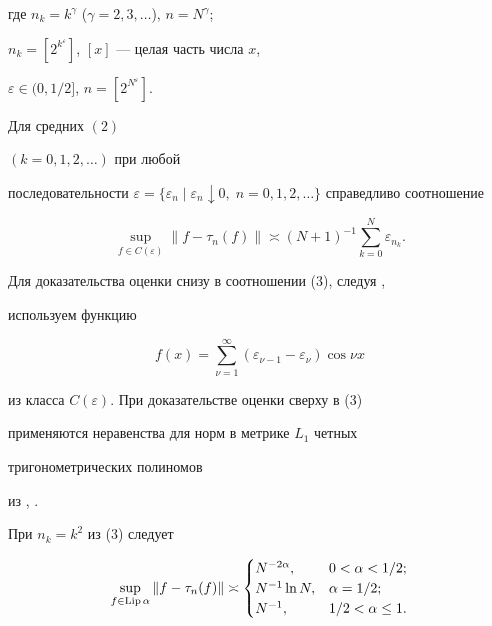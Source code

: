где $n_k=k^\gamma$ ($\gamma=2,3,\dotsc$), $n=N^\gamma$;


$n_k=[2^{k^\varepsilon}]$, $[x]$ --- целая часть числа $x$,


$\varepsilon\in(0,1/2]$, $n=[2^{N^\varepsilon}]$.





\begin{thmnonum}


Для средних $(2)$ 


$(k=0,1,2,\dotsc)$ при любой


последовательности $\varepsilon=\{\varepsilon_n\mid\varepsilon_n


\downarrow 0,\;n=0,1,2,\dotsc\}$ справедливо соотношение


\begin{equation}


\sup_{f\in C(\varepsilon)}\|f-\tau_n(f)\|\asymp


(N+1)^{-1}\sum^N_{k=0}\varepsilon_{n_k}.


\end{equation}


\end{thmnonum}





Для доказательства оценки снизу в соотношении (3), следуя \cite{1},


используем функцию


$$


f(x)=\sum^\infty_{\nu=1}(\varepsilon_{\nu-1}-\varepsilon_\nu)


\cos \nu x


$$


из класса $C(\varepsilon)$. При доказательстве оценки сверху в (3)


применяются неравенства для норм в метрике $L_1$ четных


тригонометрических полиномов


из \cite{6}, \cite{7}.





\begin{cornonum}


При $n_k=k^2$ из (3) следует


\begin{equation}


\sup_{f\in\text{Lip\,}\alpha}\|f-\tau_n(f)\|\asymp


\begin{cases}


N^{-2\alpha}, & 0<\alpha<1/2;\\


N^{-1}\ln N, & \alpha=1/2;\\


N^{-1}, & 1/2<\alpha\le 1.


\end{cases}


\end{equation}


\end{cornonum}





